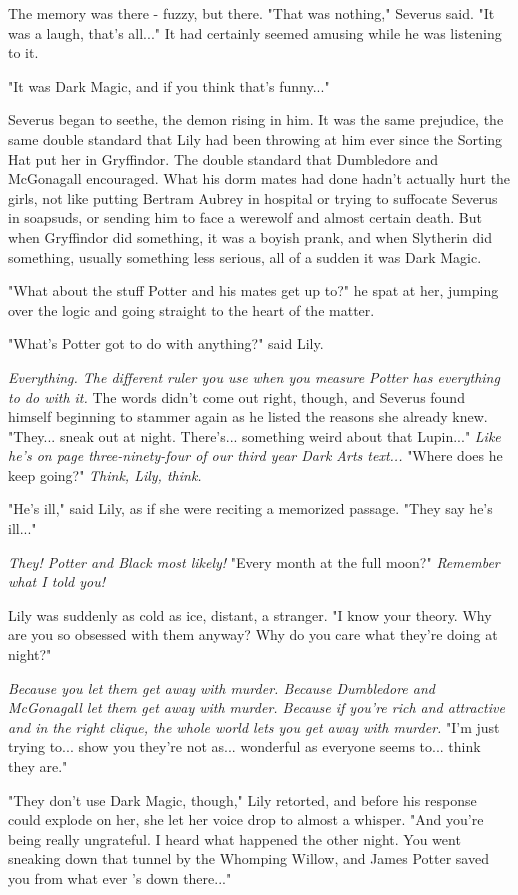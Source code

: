 The memory was there - fuzzy, but there. "That was nothing," Severus said. "It was a laugh, that's all..." It had certainly seemed amusing while he was listening to it.

"It was Dark Magic, and if you think that's funny..."

Severus began to seethe, the demon rising in him. It was the same prejudice, the same double standard that Lily had been throwing at him ever since the Sorting Hat put her in Gryffindor. The double standard that Dumbledore and McGonagall encouraged. What his dorm mates had done hadn't actually hurt the girls, not like putting Bertram Aubrey in hospital or trying to suffocate Severus in soapsuds, or sending him to face a werewolf and almost certain death. But when Gryffindor did something, it was a boyish prank, and when Slytherin did something, usually something less serious, all of a sudden it was Dark Magic.

"What about the stuff Potter and his mates get up to?" he spat at her, jumping over the logic and going straight to the heart of the matter.

"What's Potter got to do with anything?" said Lily.

\emph{Everything. The different ruler you use when you measure Potter has everything to do with it.} The words didn't come out right, though, and Severus found himself beginning to stammer again as he listed the reasons she already knew. "They... sneak out at night. There's... something weird about that Lupin..." \emph{Like he's on page three-ninety-four of our third year Dark Arts text...} "Where does he keep going?" \emph{Think, Lily, think.}

"He's ill," said Lily, as if she were reciting a memorized passage. "They say he's ill..."

\emph{They! Potter and Black most likely!} "Every month at the full moon?" \emph{Remember what I told you!}

Lily was suddenly as cold as ice, distant, a stranger. "I know your theory. Why are you so obsessed with them anyway? Why do you care what they're doing at night?"

\emph{Because you let them get away with murder. Because Dumbledore and McGonagall let them get away with murder. Because if you're rich and attractive and in the right clique, the whole world lets you get away with murder.} "I'm just trying to... show you they're not as... wonderful as everyone seems to... think they are."

"They don't use Dark Magic, though," Lily retorted, and before his response could explode on her, she let her voice drop to almost a whisper. "And you're being really ungrateful. I heard what happened the other night. You went sneaking down that tunnel by the Whomping Willow, and James Potter saved you from what ever 's down there..."

